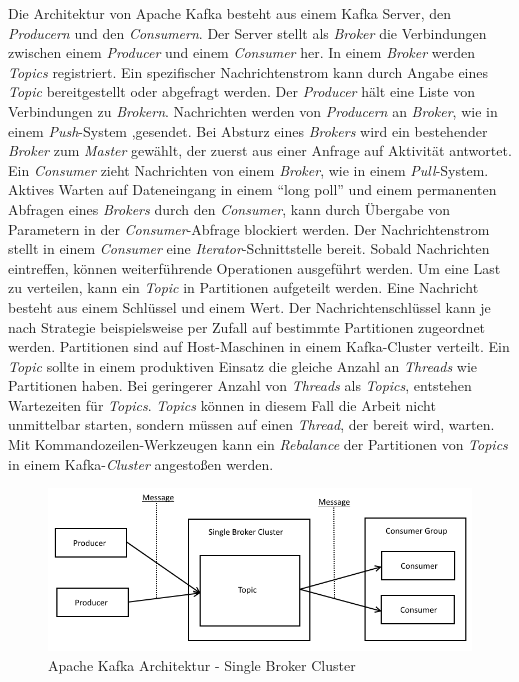 Die Architektur von Apache Kafka besteht aus einem Kafka Server, den \textit{Producern} und den \textit{Consumern}. Der Server stellt als \textit{Broker} die Verbindungen zwischen einem \textit{Producer} und einem \textit{Consumer} her. In einem \textit{Broker} werden \textit{Topics} registriert. Ein spezifischer Nachrichtenstrom kann durch Angabe eines \textit{Topic} bereitgestellt oder abgefragt werden. Der \textit{Producer} hält eine Liste von Verbindungen zu \textit{Brokern}. Nachrichten werden von \textit{Producern} an \textit{Broker}, wie in einem \textit{Push}-System ,gesendet. Bei Absturz eines \textit{Brokers} wird ein bestehender \textit{Broker} zum \textit{Master} gewählt, der zuerst aus einer Anfrage auf Aktivität antwortet. Ein \textit{Consumer} zieht Nachrichten von einem \textit{Broker}, wie in einem \textit{Pull}-System. Aktives Warten auf Dateneingang in einem "`long poll"' und einem permanenten Abfragen eines \textit{Brokers} durch den \textit{Consumer}, kann durch Übergabe von Parametern in der \textit{Consumer}-Abfrage blockiert werden. Der Nachrichtenstrom stellt in einem \textit{Consumer} eine \textit{Iterator}-Schnittstelle bereit. Sobald Nachrichten eintreffen, können weiterführende Operationen ausgeführt werden. Um eine Last zu verteilen, kann ein \textit{Topic} in Partitionen aufgeteilt werden. Eine Nachricht besteht aus einem Schlüssel und einem Wert. Der Nachrichtenschlüssel kann je nach Strategie beispielsweise per Zufall auf bestimmte Partitionen zugeordnet werden. Partitionen sind auf Host-Maschinen in  einem Kafka-Cluster verteilt. Ein \textit{Topic} sollte in einem produktiven Einsatz die gleiche Anzahl an \textit{Threads} wie Partitionen haben. Bei geringerer Anzahl von \textit{Threads} als \textit{Topics}, entstehen Wartezeiten für \textit{Topics}. \textit{Topics} können in diesem Fall die Arbeit nicht unmittelbar starten, sondern müssen auf einen \textit{Thread}, der bereit wird, warten. Mit Kommandozeilen-Werkzeugen kann ein \textit{Rebalance} der Partitionen von \textit{Topics} in einem Kafka-\textit{Cluster} angestoßen werden. 

\begin{figure}[htb!]
\centering
\includegraphics[width=1.0\textwidth]{bilder/kafkaDesign.png}
\caption{Apache Kafka Architektur - Single Broker Cluster
\label{fig:kafkaDesign}}
\end{figure}

